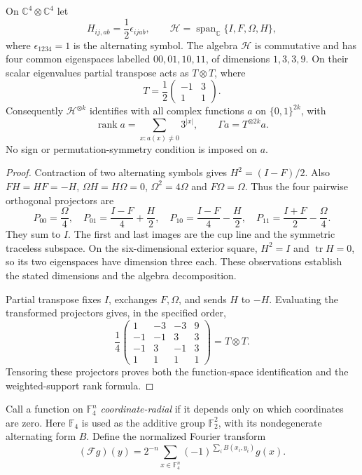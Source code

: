 \begin{proposition}
\label{prop:hodge-fourier}
On $\mathbb C^4\otimes\mathbb C^4$ let
\[
 H_{ij,ab}=\frac12\epsilon_{ijab},\qquad
 \mathcal H=\operatorname{span}_{\mathbb C}\{I,F,\Omega,H\},
\]
where $\epsilon_{1234}=1$ is the alternating symbol. The algebra
$\mathcal H$ is commutative and has four common eigenspaces labelled
$00,01,10,11$, of dimensions $1,3,3,9$. On their scalar eigenvalues
partial transpose acts as $T\otimes T$, where
\[
 T=\frac12\begin{pmatrix}-1&3\\1&1\end{pmatrix}.
\]
Consequently $\mathcal H^{\otimes k}$ identifies with all complex
functions $a$ on $\{0,1\}^{2k}$, with
\[
 \operatorname{rank}a
   =\sum_{x:a(x)\ne0}3^{|x|},\qquad
 \Gamma a=T^{\otimes2k}a.
\]
No sign or permutation-symmetry condition is imposed on $a$.
\end{proposition}

\begin{proof}
Contraction of two alternating symbols gives
$H^2=(I-F)/2$. Also $FH=HF=-H$, $\Omega H=H\Omega=0$,
$\Omega^2=4\Omega$ and $F\Omega=\Omega$. Thus the four pairwise
orthogonal projectors are
\[
 P_{00}=\frac\Omega4,\quad
 P_{01}=\frac{I-F}4+\frac H2,\quad
 P_{10}=\frac{I-F}4-\frac H2,\quad
 P_{11}=\frac{I+F}2-\frac\Omega4.
\]
They sum to $I$. The first and last images are the cup line and
the symmetric traceless subspace. On the six-dimensional exterior
square, $H^2=I$ and $\operatorname{tr}H=0$, so its two eigenspaces
have dimension three each. These observations establish the stated
dimensions and the algebra decomposition.

Partial transpose fixes $I$, exchanges $F,\Omega$, and sends
$H$ to $-H$. Evaluating the transformed projectors gives, in the
specified order,
\[
 \frac14\begin{pmatrix}
 1&-3&-3&9\\-1&-1&3&3\\-1&3&-1&3\\1&1&1&1
 \end{pmatrix}=T\otimes T.
\]
Tensoring these projectors proves both the function-space
identification and the weighted-support rank formula.
\end{proof}

Call a function on $\mathbb F_4^n$ \emph{coordinate-radial} if it
depends only on which coordinates are zero. Here $\mathbb F_4$ is
used as the additive group $\mathbb F_2^2$, with its nondegenerate
alternating form $B$. Define the normalized Fourier transform
\[
 (\mathcal Fg)(y)=2^{-n}\sum_{x\in\mathbb F_4^n}
 (-1)^{\sum_iB(x_i,y_i)}g(x).
\]

